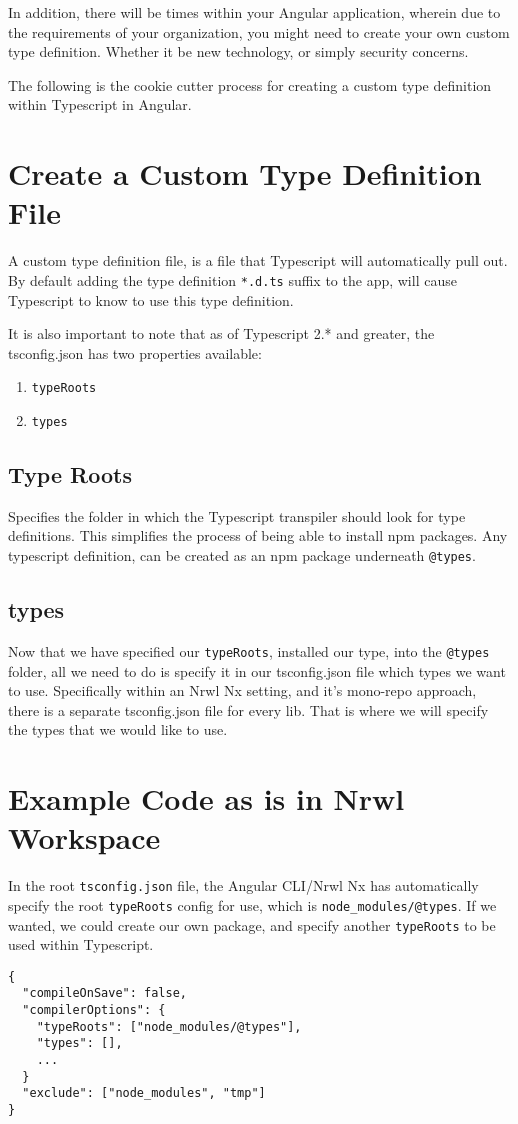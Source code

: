 In addition, there will be times within your Angular application, wherein 
due to the requirements of your organization, you might need to create your 
own custom type definition. Whether it be new technology, or simply security
concerns. 

The following is the cookie cutter process for creating a custom type 
definition within Typescript in Angular. 

\section{Create a Custom Type Definition File}
A custom type definition file, is a file that Typescript will automatically 
pull out. By default adding the type definition \lstinline{*.d.ts} suffix to
the app, will cause Typescript to know to use this type definition.

It is also important to note that as of Typescript 2.* and greater, the
tsconfig.json has two properties available: 
\begin{enumerate}
  \item \lstinline{typeRoots}
  \item \lstinline{types}
\end{enumerate}

\subsection{Type Roots}
Specifies the folder in which the Typescript transpiler should look for type 
definitions. This simplifies the process of being able to install npm packages.
Any typescript definition, can be created as an npm package underneath \lstinline{@types}.

\subsection{types}
Now that we have specified our \lstinline{typeRoots}, installed our type, into 
the \lstinline{@types} folder, all we need to do is specify it in our 
tsconfig.json file which types we want to use. Specifically within an Nrwl Nx 
setting, and it's mono-repo approach, there is a separate tsconfig.json file 
for every lib. That is where we will specify the types that we would like to 
use. 

\section{Example Code as is in Nrwl Workspace}
In the root \lstinline{tsconfig.json} file, the Angular CLI/Nrwl Nx has automatically
specify the root \lstinline{typeRoots} config for use, which is \lstinline{node_modules/@types}.
If we wanted, we could create our own package, and specify another 
\lstinline{typeRoots} to be used within Typescript. 
\begin{lstlisting}[caption=tsconfig.json]
{
  "compileOnSave": false,
  "compilerOptions": {
    "typeRoots": ["node_modules/@types"],
    "types": [],
    ...
  }
  "exclude": ["node_modules", "tmp"]
}
\end{lstlisting}

